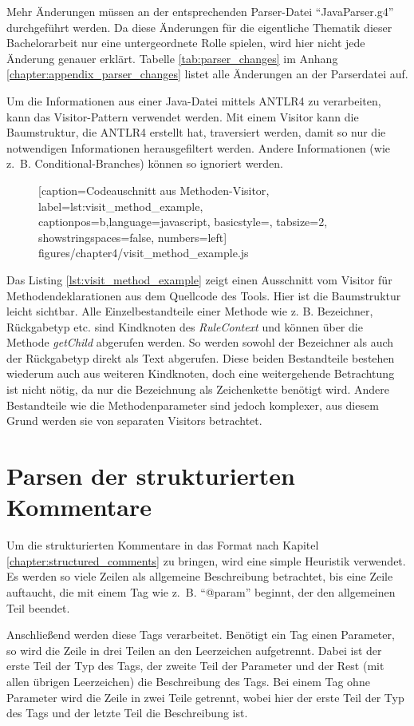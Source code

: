 Mehr Änderungen müssen an der entsprechenden Parser-Datei \enquote{JavaParser.g4} durchgeführt werden.  Da diese Änderungen für die eigentliche Thematik dieser Bachelorarbeit nur eine untergeordnete Rolle spielen, wird hier nicht jede Änderung genauer erklärt. Tabelle \ref{tab:parser_changes} im Anhang \ref{chapter:appendix_parser_changes} listet alle Änderungen an der Parserdatei auf.

Um die Informationen aus einer Java-Datei mittels ANTLR4 zu verarbeiten, kann das Visitor-Pattern verwendet werden. Mit einem Visitor kann die Baumstruktur, die ANTLR4 erstellt hat, traversiert werden, damit so nur die notwendigen Informationen herausgefiltert werden. Andere Informationen (wie z.~B. Conditional-Branches) können so ignoriert werden.  
		\begin{figure} [htbp!]
			
			[caption={Codeauschnitt aus  Methoden-Visitor},
			label={lst:visit_method_example},
			captionpos=b,language=javascript, basicstyle=\footnotesize, tabsize=2, showstringspaces=false,  numbers=left]
			{figures/chapter4/visit_method_example.js}
		\end{figure}
Das Listing \ref{lst:visit_method_example} zeigt einen Ausschnitt vom Visitor für Methodendeklarationen aus dem Quellcode des Tools. Hier ist die Baumstruktur leicht sichtbar. Alle Einzelbestandteile einer Methode wie z. B. Bezeichner, Rückgabetyp etc. sind Kindknoten des \textit{RuleContext} und können über die Methode \textit{getChild} abgerufen werden. So werden sowohl der Bezeichner als auch der Rückgabetyp direkt als Text abgerufen. Diese  beiden Bestandteile bestehen wiederum auch aus weiteren Kindknoten, doch eine weitergehende Betrachtung ist nicht nötig, da nur die Bezeichnung als Zeichenkette benötigt wird. Andere Bestandteile wie die Methodenparameter sind jedoch komplexer, aus diesem Grund werden sie von separaten Visitors betrachtet.

\section{Parsen der strukturierten Kommentare}\label{chapter:comment_parsing}
Um die strukturierten Kommentare in das Format nach Kapitel \ref{chapter:structured_comments} zu bringen, wird eine simple Heuristik verwendet. Es werden so viele Zeilen als allgemeine Beschreibung betrachtet, bis eine Zeile auftaucht, die mit einem Tag wie z.~B. \enquote{@param} beginnt, der den allgemeinen Teil beendet.

Anschließend werden diese Tags verarbeitet. Benötigt ein Tag einen Parameter, so wird die Zeile in drei Teilen an den Leerzeichen aufgetrennt. Dabei ist der erste Teil der Typ des Tags, der zweite Teil der Parameter und der Rest (mit allen übrigen Leerzeichen) die Beschreibung des Tags.
Bei einem Tag ohne Parameter wird die Zeile in zwei Teile getrennt, wobei hier der erste Teil der Typ des Tags und der letzte Teil die Beschreibung ist.

